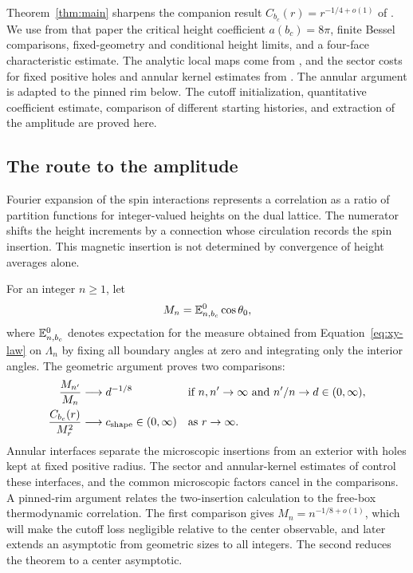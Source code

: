 Theorem~\ref{thm:main} sharpens the companion result
\(C_{b_c}(r)=r^{-1/4+o(1)}\) of \cite{C}.  We use from that paper
the critical height coefficient \(a(b_c)=8\pi\), finite Bessel
comparisons, fixed-geometry and conditional height limits, and a
four-face characteristic estimate.  The analytic local maps come from
\cite{B}, and the sector costs for fixed positive holes and annular kernel
estimates from \cite{S}.  The annular argument is adapted to the pinned
rim below.  The cutoff initialization, quantitative coefficient estimate,
comparison of different starting histories, and extraction of the amplitude
are proved here.

\subsection{The route to the amplitude}

Fourier expansion of the spin interactions represents a correlation
as a ratio of partition functions for integer-valued heights on the
dual lattice.  The numerator shifts the height increments by a connection
whose circulation records the spin insertion.  This magnetic insertion
is not determined by convergence of height averages alone.

For an integer \(n\ge1\), let
\begin{equation}\label{eq:center-definition}
 M_n=\mathbb E^0_{n,b_c}\cos\theta_0,
\end{equation}
where \(\mathbb E^0_{n,b_c}\) denotes expectation for the measure obtained
from Equation~\eqref{eq:xy-law} on \(\Lambda_n\) by fixing all boundary
angles at zero and integrating only the interior angles.  The geometric
argument proves two comparisons:
\[
 \begin{aligned}
 \frac{M_{n'}}{M_n}&\longrightarrow d^{-1/8}
 &&\text{if }n,n'\to\infty\text{ and }n'/n\to d\in(0,\infty),\\
 \frac{C_{b_c}(r)}{M_r^2}&\longrightarrow c_{\rm shape}\in(0,\infty)
 &&\text{as }r\to\infty.
 \end{aligned}
\]
Annular interfaces separate the microscopic insertions from an exterior
with holes kept at fixed positive radius.  The sector and annular-kernel
estimates of \cite{S} control these interfaces, and the common microscopic
factors cancel in the comparisons.  A pinned-rim argument relates the
two-insertion calculation to the free-box thermodynamic correlation.
The first comparison gives \(M_n=n^{-1/8+o(1)}\), which will make the
cutoff loss negligible relative to the center observable, and later
extends an asymptotic from geometric sizes to all integers.  The second
reduces the theorem to a center asymptotic.

